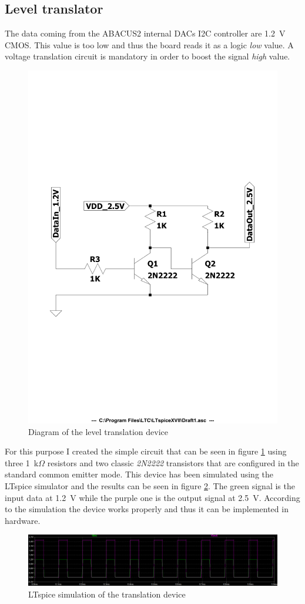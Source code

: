\subsection{Level translator}\label{leveltranslator}
The data coming from the ABACUS2 internal DACs I2C controller are 1.2~V CMOS. This value is too low and thus the board reads it as a logic \textit{low} value. A voltage translation circuit is mandatory in order to boost the signal \textit{high} value.
\begin{figure}[H]
	\centering
	\includegraphics[width=0.6\linewidth]{IMG/ch5/DIAGRAM}
	\caption{Diagram of the level translation device}
	\label{fig:diagram}
\end{figure}
\noindent For this purpose I created the simple circuit that can be seen in figure \ref{fig:diagram} using three 1~k$\Omega$ resistors and two classic \textit{2N2222} transistors that are configured in the standard common emitter mode.
This device has been simulated using the LTspice simulator and the results can be seen in figure \ref{fig:transsimulation}.
The green signal is the input data at 1.2~V while the purple one is the output signal at 2.5~V.
According to the simulation the device works properly and thus it can be implemented in hardware.
\begin{figure}[H]
	\centering
	\includegraphics[width=1\linewidth]{IMG/ch5/TRANSSIMULATION}
	\caption{LTspice simulation of the translation device}
	\label{fig:transsimulation}
\end{figure}
